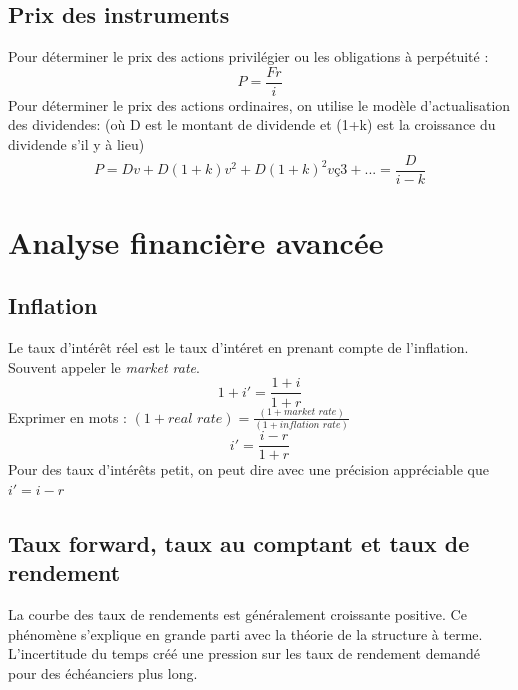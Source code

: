 \documentclass[11pt,french]{report}
\begin{document}
\section{Prix des instruments}
\label{sec:price share stock}
Pour déterminer le prix des actions privilégier ou les obligations à perpétuité :
\begin{equation}
P = \frac{Fr}{i}
\end{equation}
Pour déterminer le prix des actions ordinaires, on utilise le modèle d'actualisation des dividendes: (où D est le montant de dividende et (1+k) est la croissance du dividende s'il y à lieu)
\begin{equation}
P = Dv + D(1+k)v^2 + D(1+k)^2vç3 + ... = \frac{D}{i - k}
\end{equation}


\chapter{Analyse financière avancée}
\label{cha:advanced financial analysis}

\section{Inflation}
\label{sec:inflation}

Le taux d'intérêt réel est le taux d'intéret en prenant compte de l'inflation. Souvent appeler le \emph{market rate}.
\begin{equation}
1 + i' = \frac{1+i}{1+r}
\end{equation}
Exprimer en mots : $( 1 + \textit{real rate})= \frac{(1 + \textit{market rate})}{(1 + \textit{inflation rate})}$
\begin{equation}
i'=\frac{i-r}{1+r}
\end{equation}
Pour des taux d'intérêts petit, on peut dire avec une précision appréciable que $i' = i -r $

\section{Taux forward, taux au comptant et taux de rendement}
\label{sec:spot, forward et yield}

La courbe des taux de rendements est généralement croissante positive. Ce phénomène s'explique en grande parti avec la théorie de la structure à terme. L'incertitude du temps créé une pression sur les taux de rendement demandé pour des échéanciers plus long. 
\end{document}
